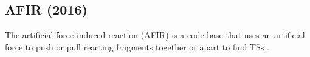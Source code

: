 \documentclass[preprint, 11pt]{elsarticle} %
\begin{document}

\subsection{AFIR (2016)}

The artificial force induced reaction (AFIR) is a code base that uses an artificial force to push or pull reacting fragments together or apart to find TSs \cite{Maeda:2016, Madea:2018}. 
\end{document}
